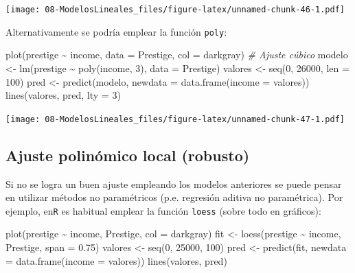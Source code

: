 \documentclass[
]{book}
\newenvironment{Shaded}{\begin{snugshade}}{\end{snugshade}}
\newcommand{\AttributeTok}[1]{\textcolor[rgb]{0.77,0.63,0.00}{#1}}
\newcommand{\CommentTok}[1]{\textcolor[rgb]{0.56,0.35,0.01}{\textit{#1}}}
\newcommand{\DecValTok}[1]{\textcolor[rgb]{0.00,0.00,0.81}{#1}}
\newcommand{\FloatTok}[1]{\textcolor[rgb]{0.00,0.00,0.81}{#1}}
\newcommand{\FunctionTok}[1]{\textcolor[rgb]{0.00,0.00,0.00}{#1}}
\newcommand{\NormalTok}[1]{#1}
\newcommand{\OtherTok}[1]{\textcolor[rgb]{0.56,0.35,0.01}{#1}}
\newcommand{\SpecialCharTok}[1]{\textcolor[rgb]{0.00,0.00,0.00}{#1}}
\newcommand{\StringTok}[1]{\textcolor[rgb]{0.31,0.60,0.02}{#1}}
\theoremstyle{break}
\theoremstyle{nonumberplain}
\begin{document}
\texttt{[image: 08-ModelosLineales\_files/figure-latex/unnamed-chunk-46-1.pdf]}

Alternativamente se podría emplear la función \texttt{poly}:

\begin{Shaded}
\begin{Highlighting}[]
\FunctionTok{plot}\NormalTok{(prestige }\SpecialCharTok{\textasciitilde{}}\NormalTok{ income, }\AttributeTok{data =}\NormalTok{ Prestige, }\AttributeTok{col =} \StringTok{\textquotesingle{}darkgray\textquotesingle{}}\NormalTok{)}
\CommentTok{\# Ajuste cúbico}
\NormalTok{modelo }\OtherTok{\textless{}{-}} \FunctionTok{lm}\NormalTok{(prestige }\SpecialCharTok{\textasciitilde{}} \FunctionTok{poly}\NormalTok{(income, }\DecValTok{3}\NormalTok{), }\AttributeTok{data =}\NormalTok{ Prestige)}
\NormalTok{valores }\OtherTok{\textless{}{-}} \FunctionTok{seq}\NormalTok{(}\DecValTok{0}\NormalTok{, }\DecValTok{26000}\NormalTok{, }\AttributeTok{len =} \DecValTok{100}\NormalTok{)}
\NormalTok{pred }\OtherTok{\textless{}{-}} \FunctionTok{predict}\NormalTok{(modelo, }\AttributeTok{newdata =} \FunctionTok{data.frame}\NormalTok{(}\AttributeTok{income =}\NormalTok{ valores))}
\FunctionTok{lines}\NormalTok{(valores, pred, }\AttributeTok{lty =} \DecValTok{3}\NormalTok{) }
\end{Highlighting}
\end{Shaded}

\texttt{[image: 08-ModelosLineales\_files/figure-latex/unnamed-chunk-47-1.pdf]}

\hypertarget{ajuste-polinuxf3mico-local-robusto}{%
\subsection{Ajuste polinómico local (robusto)}\label{ajuste-polinuxf3mico-local-robusto}}

Si no se logra un buen ajuste empleando los modelos anteriores se puede pensar en
utilizar métodos no paramétricos (p.e. regresión aditiva no paramétrica). Por ejemplo,
en\texttt{R} es habitual emplear la función \texttt{loess} (sobre todo en gráficos):

\begin{Shaded}
\begin{Highlighting}[]
\FunctionTok{plot}\NormalTok{(prestige }\SpecialCharTok{\textasciitilde{}}\NormalTok{ income, Prestige, }\AttributeTok{col =} \StringTok{\textquotesingle{}darkgray\textquotesingle{}}\NormalTok{)}
\NormalTok{fit }\OtherTok{\textless{}{-}} \FunctionTok{loess}\NormalTok{(prestige }\SpecialCharTok{\textasciitilde{}}\NormalTok{ income, Prestige, }\AttributeTok{span =} \FloatTok{0.75}\NormalTok{)}
\NormalTok{valores }\OtherTok{\textless{}{-}} \FunctionTok{seq}\NormalTok{(}\DecValTok{0}\NormalTok{, }\DecValTok{25000}\NormalTok{, }\DecValTok{100}\NormalTok{)}
\NormalTok{pred }\OtherTok{\textless{}{-}} \FunctionTok{predict}\NormalTok{(fit, }\AttributeTok{newdata =} \FunctionTok{data.frame}\NormalTok{(}\AttributeTok{income =}\NormalTok{ valores))}
\FunctionTok{lines}\NormalTok{(valores, pred)}
\end{Highlighting}
\end{Shaded}
\end{document}
